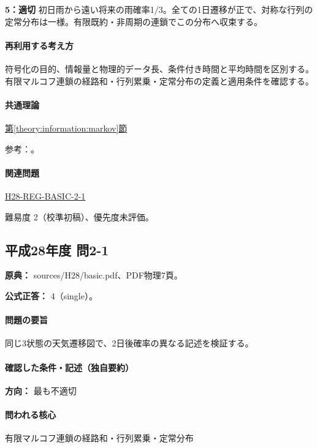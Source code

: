 \noindent\textbf{5：適切} 初日雨から遠い将来の雨確率1/3。全ての1日遷移が正で、対称な行列の定常分布は一様。有限既約・非周期の連鎖でこの分布へ収束する。\par

\paragraph{再利用する考え方} 符号化の目的、情報量と物理的データ長、条件付き時間と平均時間を区別する。有限マルコフ連鎖の経路和・行列累乗・定常分布の定義と適用条件を確認する。

\paragraph{共通理論} \hyperref[theory:information:markov]{第\ref*{theory:information:markov}節}

\par 参考：\cite{info_markov}。

\paragraph{関連問題} \hyperref[q:h28-reg-basic-2-1]{H28-REG-BASIC-2-1}

\par 難易度 2（校準初稿）、優先度未評価。

\subsection{平成28年度 問2-1}
\label{q:h28-reg-basic-2-1}

\noindent\textbf{原典：} sources/H28/basic.pdf、PDF物理7頁。

\textbf{公式正答：} 4（single）。

\paragraph{問題の要旨} 同じ3状態の天気遷移図で、2日後確率の異なる記述を検証する。

\paragraph{確認した条件・記述（独自要約）}\mbox{}\par

\noindent\textbf{方向：} 最も不適切\par

\paragraph{問われる核心} 有限マルコフ連鎖の経路和・行列累乗・定常分布

